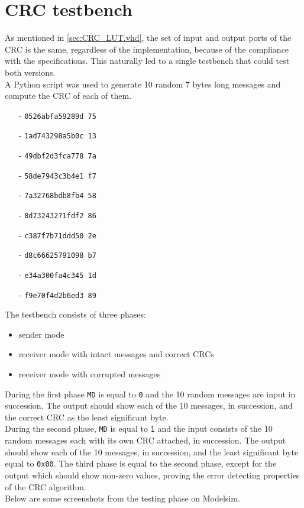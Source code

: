 \section{CRC testbench}
As mentioned in \ref{sec:CRC_LUT.vhd}, the set of input and output ports of the CRC is the same, regardless of the implementation, because of the compliance with the specifications. This naturally led to a single testbench that could test both versions.\\
\hfill \break
A Python script was used to generate 10 random 7 bytes long messages and compute the CRC of each of them.
\begin{itemize}
	\setlength{\itemsep}{1pt}
  	\setlength{\parskip}{0pt}
  	\setlength{\parsep}{0pt}
	\item[-] \texttt{0526abfa59289d 75}
	\item[-] \texttt{1ad743298a5b0c 13}
	\item[-] \texttt{49dbf2d3fca778 7a}
	\item[-] \texttt{58de7943c3b4e1 f7}
	\item[-] \texttt{7a32768bdb8fb4 58}
	\item[-] \texttt{8d73243271fdf2 86}
	\item[-] \texttt{c387f7b71ddd50 2e}
	\item[-] \texttt{d8c66625791098 b7}
	\item[-] \texttt{e34a300fa4c345 1d}
	\item[-] \texttt{f9e70f4d2b6ed3 89}
\end{itemize}
\pagebreak
The testbench consists of three phases:
\begin{itemize}
	\item sender mode
	\item receiver mode with intact messages and correct CRCs
	\item receiver mode with corrupted messages
\end{itemize}
During the first phase \texttt{MD} is equal to \texttt{0} and the 10 random messages are input in succession. The output should show each of the 10 messages, in succession, and the correct CRC as the least significant byte.\\
During the second phase, \texttt{MD} is equal to \texttt{1} and the input consists of the 10 random messages each with its own CRC attached, in succession. The output should show each of the 10 messages, in succession, and the least significant byte equal to \texttt{0x00}.
The third phase is equal to the second phase, except for the output which should show non-zero values, proving the error detecting properties of the CRC algorithm.\\
Below are some screenshots from the testing phase on Modelsim.\\

